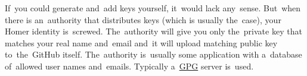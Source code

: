 If~you could generate and~add keys yourself, it~would lack any~sense.
But~when there is an~authority that distributes keys (which is usually the~case), your Homer identity is~screwed.
The~authority will give you only the~private key that matches your real name and~email and~it will upload matching public key to~the~GitHub itself.
The~authority is~usually some application with a~database of~allowed user names and~emails.
Typically a~\hyperref[pgpgpg]{GPG} server is~used.
